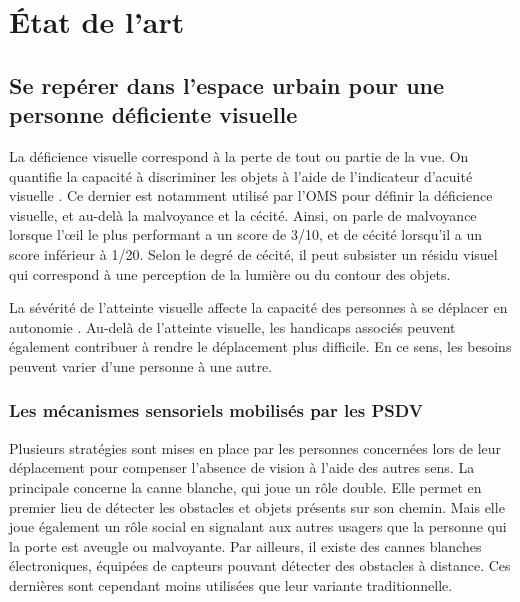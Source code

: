 \chapter{État de l'art}

\section{Se repérer dans l'espace urbain pour une personne déficiente visuelle}

%
%

La déficience visuelle correspond à la perte de tout ou partie de la vue. On quantifie la capacité à discriminer les objets à l'aide de l'indicateur d'acuité visuelle . Ce dernier est notamment utilisé par l'OMS pour définir la déficience visuelle, et au-delà la malvoyance et la cécité. Ainsi, on parle de malvoyance lorsque l'œil le plus performant a un score de 3/10, et de cécité lorsqu'il a un score inférieur à 1/20. Selon le degré de cécité, il peut subsister un résidu visuel qui correspond à une perception de la lumière ou du contour des objets. 

La sévérité de l'atteinte visuelle affecte la capacité des personnes à se déplacer en autonomie \cite{homere_2023}. Au-delà de l'atteinte visuelle, les handicaps associés peuvent également contribuer à rendre le déplacement plus difficile. En ce sens, les besoins peuvent varier d'une personne à une autre.

\subsection{Les mécanismes sensoriels mobilisés par les PSDV}

%
%

Plusieurs stratégies sont mises en place par les personnes concernées lors de leur déplacement pour compenser l'absence de vision à l'aide des autres sens. La principale concerne la canne blanche, qui joue un rôle double. Elle permet en premier lieu de détecter les obstacles et objets présents sur son chemin. Mais elle joue également un rôle social en signalant aux autres usagers que la personne qui la porte est aveugle ou malvoyante. Par ailleurs, il existe des cannes blanches électroniques, équipées de capteurs pouvant détecter des obstacles à distance. Ces dernières sont cependant moins utilisées que leur variante traditionnelle. 

